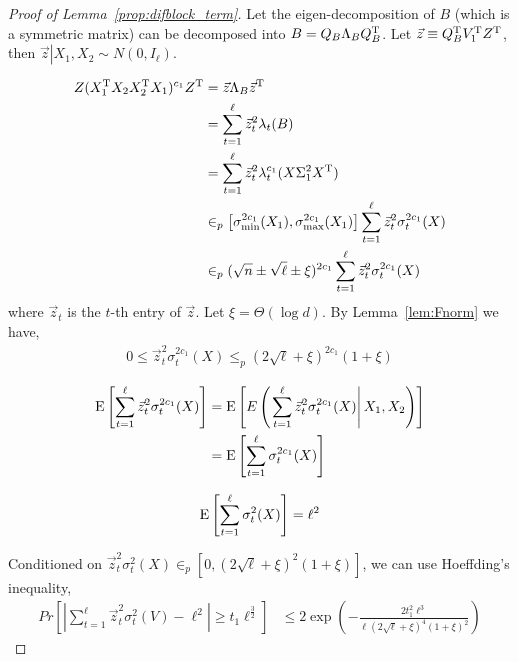 \begin{proof}[Proof of Lemma~\ref{prop:difblock_term}]
Let the eigen-decomposition of $B$ (which is a symmetric matrix) can be decomposed into $B = Q_{B}\Lambda_{B} Q^{\mathrm{T}}_{B}$. Let $\vec z \equiv Q^{\mathrm{T}}_{B} V^{\mathrm{T}}_{1} Z^{\mathrm{T}}$, then $\left. \vec z  \right| X_1, X_2 \sim N\left(0, I_{\ell}\right)$.
 
\begin{equation}     \label{eqn:temp7}
\begin{split}
    Z(X_1^{\mathrm{T}}X_2X_2^{\mathrm{T}}X_1)^{c_1} Z^{\mathrm{T}} 
    &= \vec z\Lambda_{B} \vec z^{\mathrm{T}}  \\ 
    &= \sum^{\ell}_{t = 1}\vec z^2_{t}\lambda_{t}(B) \\
    &=\sum^{\ell}_{t = 1}\vec z^2_{t}\lambda^{c_1}_{t}(X\Sigma^2_{1} X^{\mathrm{T}}) \\
    &\in_p   \left[\sigma^{2c_1}_{\min}(X_{1})  ,\sigma^{2c_1}_{\max}(X_{1}) \right]\sum^{\ell}_{t = 1}\vec z^2_{t}\sigma^{2c_1}_{t}(X) \\
    &\in_p (\sqrt{n} \pm \sqrt{\ell} \pm \xi)^{2c_1}\sum^{\ell}_{t = 1}\vec z^2_{t}\sigma^{2c_1}_{t}(X)
\end{split}
\end{equation}
where $\vec z_{t}$ is the $t$-th entry of $\vec z$. Let $\xi = \Theta(\log d)$. By Lemma~\ref{lem:Fnorm} we have,
\begin{equation}
\begin{split}
    0 \leq \vec z^2_{t}\sigma^{2c_1}_{t}(X)
    \leq_p (2\sqrt{\ell}+\xi)^{2c_1} (1+\xi)
\end{split}
\end{equation}

\begin{equation}
\begin{split}
    \mathrm{E}\left[\sum^{\ell}_{t = 1}\vec z^2_{t}\sigma^{2c_1}_{t}(X) \right] 
    & = \mathrm{E}\left[E\left(\left.\sum^{\ell}_{t = 1}\vec z^2_{t}\sigma^{2c_1}_{t}(X) \right|X_1,X_2 \right) \right]       \\ 
    &=\mathrm{E}\left[\sum^{\ell}_{t = 1}\sigma^{2c_1}_{t}(X) \right]      
\end{split}
\end{equation}

\begin{equation}
    \mathrm{E}\left[\sum^{\ell}_{t = 1}\sigma^{2}_{t}(X) \right]  = \ell^2
\end{equation}

Conditioned on $\vec z^2_{t}\sigma^{2}_{t}(X)
      \in_p \left[0,  (2\sqrt{\ell}+\xi)^2(1+\xi) \right]$, we can use Hoeffding's inequality,
\begin{equation}
\begin{split}
    Pr\left[ \left|\sum^{\ell}_{t = 1}\vec z^2_{t}\sigma^{2}_{t}(V) - \ell^2 \right| \geq t_1 \ell^{\frac{3}{2}} \right]  
    &\leq   2\exp \left(-\frac{2t_1^2\ell^3}{\ell(2\sqrt{\ell}+\xi)^4 (1+\xi)^2 } \right)      
\end{split}
\end{equation}


\end{proof}
